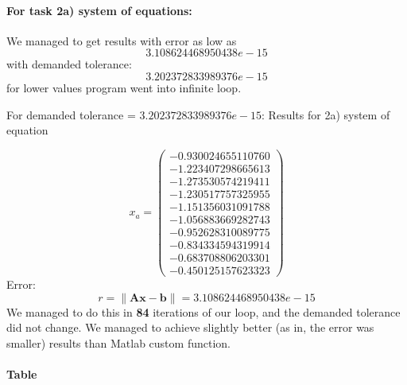 \documentclass{report}
\begin{document}
\paragraph{For task 2a) system of equations:}
We managed to get results with error as low as
\[ 3.108624468950438e-15 \] with demanded tolerance:
\[ 3.202372833989376e-15 \]
for lower values program went into infinite loop.

For demanded tolerance = $3.202372833989376e-15$:
Results for 2a) system of equation

\[ x_a = \left( \begin{array}{cc}
-0.930024655110760 \\
-1.223407298665613 \\
-1.273530574219411 \\
-1.230517757325955 \\
-1.151356031091788 \\
-1.056883669282743 \\
-0.952628310089775 \\
-0.834334594319914 \\
-0.683708806203301 \\
-0.450125157623323
\end{array} \right)
\]
Error:
\[ r = \| \mathbf{A}\mathbf{x} - \mathbf{b}\| = 3.108624468950438e-15 \]
We managed to do this in \textbf{84} iterations of our loop, and the demanded tolerance did not change.
We managed to achieve slightly better (as in, the error was smaller) results than Matlab custom function.

\paragraph{Table}
\end{document}
